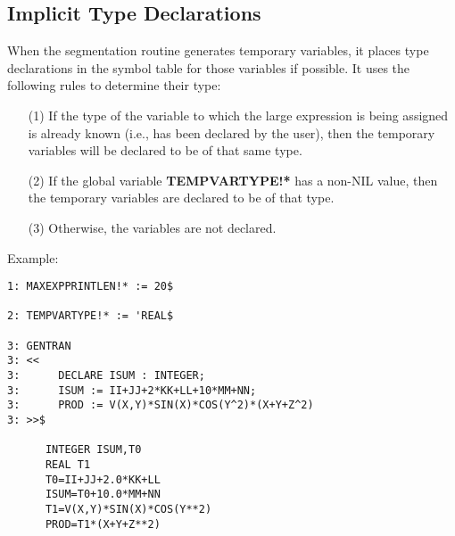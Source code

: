 \subsection{Implicit Type Declarations}
When the segmentation routine generates temporary variables, it places
type declarations in the symbol table for those variables if
possible.  It uses the following rules to determine their type:
\begin{itemize}
\item[{(1)}]
If the type of the variable to which the large expression is being
assigned is already known (i.e., has been declared by the user),
then the temporary variables will be declared to be of that same type.
\item[{(2)}]
If the global variable {\bf TEMPVARTYPE!*} has a non-NIL value, then the
temporary variables are declared to be of that type.
\item[{(3)}]
Otherwise, the variables are not declared.
\end{itemize}
\begin{describe}{Example:}
\begin{verbatim}
1: MAXEXPPRINTLEN!* := 20$

2: TEMPVARTYPE!* := 'REAL$ 

3: GENTRAN 
3: << 
3:      DECLARE ISUM : INTEGER; 
3:      ISUM := II+JJ+2*KK+LL+10*MM+NN; 
3:      PROD := V(X,Y)*SIN(X)*COS(Y^2)*(X+Y+Z^2) 
3: >>$ 

      INTEGER ISUM,T0
      REAL T1
      T0=II+JJ+2.0*KK+LL
      ISUM=T0+10.0*MM+NN
      T1=V(X,Y)*SIN(X)*COS(Y**2)
      PROD=T1*(X+Y+Z**2)
\end{verbatim}
\end{describe}
